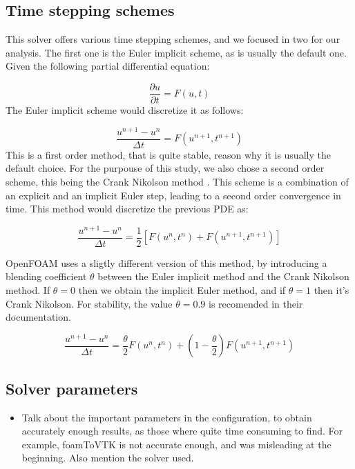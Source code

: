 \documentclass[
  english,        %
  font=times,     %
  onecolumn,      %
]{tumarticle}
\begin{document}
\subsection{Time stepping schemes}\label{sec:euler}
This solver offers various time stepping schemes, and we focused in two for our analysis. The first one is the Euler implicit scheme, as is usually the default one. Given the following partial differential equation:

\begin{equation}
    \frac{\partial u}{\partial t} = F(u, t)
\end{equation}
The Euler implicit scheme would discretize it as follows:

\begin{equation}
    \frac{u^{n+1} - u^n}{\Delta t} = {F}(u^{n+1}, t^{n+1})
\end{equation}
This is a first order method, that is quite stable, reason why it is usually the default choice. For the purpouse of this study, we also chose a second order scheme, this being the Crank Nikolson method \cite{crank1947practical}. This scheme is a combination of an explicit and an implicit Euler step, leading to a second order convergence in time. This method would discretize the previous PDE as: 

\begin{equation}
    \frac{u^{n+1} - u^n}{\Delta t} = \frac{1}{2} \left[F(u^n, t^n) +  F(u^{n+1}, t^{n+1}) \right]
\end{equation}


OpenFOAM uses a sligtly different version of this method, by introducing a blending coefficient $\theta$ between the Euler implicit method and the Crank Nikolson method. If $\theta = 0$ then we obtain the implicit Euler method, and if $\theta = 1$ then it's Crank Nikolson. For stability, the value $\theta = 0.9$ is recomended in their documentation.

\begin{equation}
    \frac{u^{n+1} - u^n}{\Delta t} = \frac{\theta}{2} F(u^{n}, t^{n}) + \left( 1 - \frac{\theta}{2} \right) F(u^{n+1}, t^{n+1})
\end{equation}



\subsection{Solver parameters}
\begin{itemize}
    \item Talk about the important parameters in the configuration, to obtain accurately enough results, as those where quite time consuming to find. For example, foamToVTK is not accurate enough, and was misleading at the beginning. Also mention the solver used.
\end{itemize}
\end{document}
